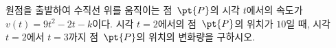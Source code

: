 원점을 출발하여 수직선 위를 움직이는 점~$\pt{P}$의 시각 $t$에서의 속도가 $v(t)=9t^2-2t-k$이다. 시각 $t=2$에서의 점~$\pt{P}$의 위치가 $10$일 때, 시각 $t=2$에서 $t=3$까지 점~$\pt{P}$의 위치의 변화량을 구하시오. 
